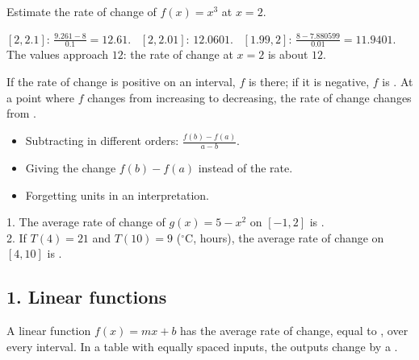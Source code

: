 Estimate the rate of change of $f(x)=x^3$ at $x=2$.
\begin{workspace}[3cm]
$[2,2.1]$: $\frac{9.261-8}{0.1}=12.61$. \ $[2,2.01]$: $12.0601$. \ $[1.99,2]$: $\frac{8-7.880599}{0.01}=11.9401$.\\
The values approach $12$: the rate of change at $x=2$ is about $12$.
\end{workspace}

\begin{keyidea}
If the rate of change is positive on an interval, $f$ is  there; if it is negative, $f$ is . At a point where $f$ changes from increasing to decreasing, the rate of change changes from .
\end{keyidea}

\begin{mistakes}
\begin{itemize}
\item Subtracting in different orders: $\frac{f(b)-f(a)}{a-b}$.
\item Giving the change $f(b)-f(a)$ instead of the rate.
\item Forgetting units in an interpretation.
\end{itemize}
\end{mistakes}

\begin{quickcheck}
1. The average rate of change of $g(x)=5-x^2$ on $[-1,2]$ is .\\
2. If $T(4)=21$ and $T(10)=9$ ($^\circ$C, hours), the average rate of change on $[4,10]$ is .
\end{quickcheck}


\subsection*{1. Linear functions}
\begin{keyidea}
A linear function $f(x)=mx+b$ has the  average rate of change, equal to , over every interval. In a table with equally spaced inputs, the outputs change by a .
\end{keyidea}

